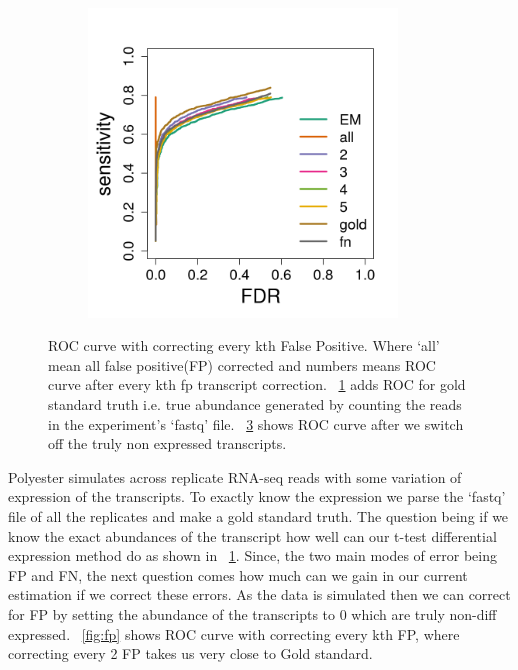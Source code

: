 \documentclass{article}
\begin{document}
\begin{figure}
\begin{subfigure}[t]{0.450\textwidth}
      \caption{\label{fig:gold}}
  \end{subfigure}
  \qquad
  \begin{subfigure}[t]{0.55\textwidth}
    \centering
      \includegraphics[width=0.9\textwidth]{figures/fn.png}
      \caption{\label{fig:fn}}
  \end{subfigure}
  \caption{ROC curve with correcting every kth False Positive. Where `all' mean all false positive(FP) corrected and numbers means ROC curve after every kth fp transcript correction. ~\cref{fig:gold} adds ROC for gold standard truth i.e. true abundance generated by counting the reads in the experiment's `fastq' file. ~\cref{fig:fn} shows ROC curve after we switch off the truly non expressed transcripts.}
\end{figure}

Polyester simulates across replicate RNA-seq reads with some variation of expression of the transcripts. To exactly know the expression we parse the `fastq' file of all the replicates and make a gold standard truth. The question being if we know the exact abundances of the transcript how well can our t-test differential expression method do as shown in ~\cref{fig:gold}. Since, the two main modes of error being FP and FN, the next question comes how much can we gain in our current estimation if we correct these errors. As the data is simulated then we can correct for FP by setting the abundance of the transcripts to 0 which are truly non-diff expressed. ~\cref{fig:fp} shows ROC curve with correcting every kth FP, where correcting every 2 FP takes us very close to Gold standard.
\end{document}
